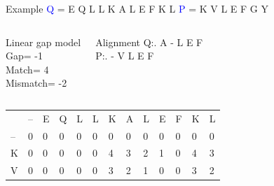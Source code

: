 \documentclass{bredelebeamer}
\begin{document}
 \begin{frame}{Example}
 \centering
 \textcolor{blue}{Q} = E Q L L K A L E F K L \quad \textcolor{blue}{P} = K V L E F G Y
\begin{columns}
\begin{block}{Linear gap model} \\
Gap= -1 \\
Match= 4 \\
Mismatch= -2
\end{block}
\begin{block}{Alignment}
Q:\quad . A - L E F \\
P:\quad . - V L E F
\end{block}
\end{columns}

\begin{table}[]
\centering
\begin{tabular}{*{13}{p{0.4cm}}}
                        & --                     & E                      & Q                      & L                      & L                      & K                      & \cellcolor[HTML]{FF0000}A                      & L                      &E                       & F                                               & K                       & L                       \\ \cline{2-13} 
\multicolumn{1}{l|}{--} & \multicolumn{1}{l|}{0} & \multicolumn{1}{l|}{0} & \multicolumn{1}{l|}{0} & \multicolumn{1}{l|}{0} & \multicolumn{1}{l|}{0} & \multicolumn{1}{l|}{0} & \multicolumn{1}{l|}{0} & \multicolumn{1}{l|}{0} & \multicolumn{1}{l|}{0}  & \multicolumn{1}{l|}{0}                          & \multicolumn{1}{l|}{0}  & \multicolumn{1}{l|}{0}  \\ \cline{2-13} 
\multicolumn{1}{l|}{\cellcolor[HTML]{FFFF00}K}  & \multicolumn{1}{l|}{0} & \multicolumn{1}{l|}{0} & \multicolumn{1}{l|}{0} & \multicolumn{1}{l|}{0} & \multicolumn{1}{l|}{0} & \multicolumn{1}{l|}{4} & \multicolumn{1}{l|}{\cellcolor[HTML]{00FF00}3} & \multicolumn{1}{l|}{2} & \multicolumn{1}{l|}{1}  & \multicolumn{1}{l|}{0}                          & \multicolumn{1}{l|}{4}  & \multicolumn{1}{l|}{3}  \\ \cline{2-13}  %
\multicolumn{1}{l|}{V}  & \multicolumn{1}{l|}{0} & \multicolumn{1}{l|}{0} & \multicolumn{1}{l|}{0} & \multicolumn{1}{l|}{0} & \multicolumn{1}{l|}{0} & \multicolumn{1}{l|}{3} & \multicolumn{1}{l|}{\cellcolor[HTML]{00FF00}2} & \multicolumn{1}{l|}{1} & \multicolumn{1}{l|}{0}  & \multicolumn{1}{l|}{0}                          & \multicolumn{1}{l|}{3}  & \multicolumn{1}{l|}{2}  \\ \cline{2-13} 

\end{tabular}
\end{table}
\end{frame}
\end{document}
